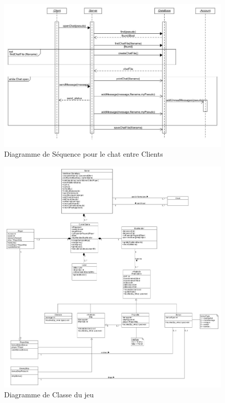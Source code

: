\documentclass[a4paper,12pt]{article}
\begin{document}
\begin{figure}[hbtp]
\centering
\includegraphics[scale=0.4]{images/Chat-sequence-diagram.jpg}
\caption{Diagramme de Séquence pour le chat entre Clients }
\end{figure}


\begin{figure}[hbtp]
\centering
\includegraphics[scale=0.3]{images/newGameClassDiagram.jpg}
\caption{Diagramme de Classe du jeu}
\end{figure}
\end{document}

